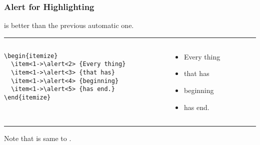 \begin{frame}[fragile]
\frametitle{Alert for Highlighting}%

  {\color{Violet}} is better than the previous automatic one.

\rule{\linewidth}{0.5mm}

  \begin{columns}
    \footnotesize
    \begin{column}{.5\textwidth}
      \begin{verbatim}
\begin{itemize}
  \item<1->\alert<2> {Every thing}
  \item<1->\alert<3> {that has}
  \item<1->\alert<4> {beginning}
  \item<1->\alert<5> {has end.}
\end{itemize}
      \end{verbatim}
    \end{column}

    \begin{column}{.3\textwidth}
      \begin{itemize}
        \item<1->\alert<2> {Every thing}
        \item<1->\alert<3> {that has}
        \item<1->\alert<4> {beginning}
        \item<1->\alert<5> {has end.}
      \end{itemize}
    \end{column}
  \end{columns}

\rule{\linewidth}{0.5mm}

  Note that {\color{Violet}} is same to {\color{Violet}}.

\end{frame}
